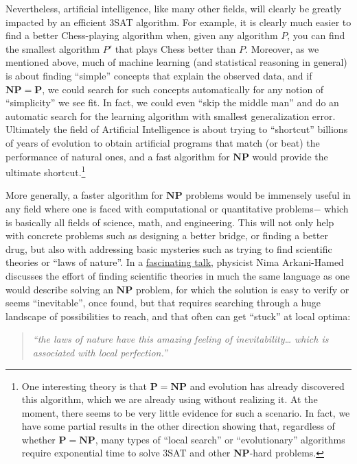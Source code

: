 Nevertheless, artificial intelligence, like many other fields, will
clearly be greatly impacted by an efficient 3SAT algorithm. For example,
it is clearly much easier to find a better Chess-playing algorithm when,
given any algorithm \(P\), you can find the smallest algorithm \(P'\)
that plays Chess better than \(P\). Moreover, as we mentioned above,
much of machine learning (and statistical reasoning in general) is about
finding ``simple'' concepts that explain the observed data, and if
\(\mathbf{NP}=\mathbf{P}\), we could search for such concepts
automatically for any notion of ``simplicity'' we see fit. In fact, we
could even ``skip the middle man'' and do an automatic search for the
learning algorithm with smallest generalization error. Ultimately the
field of Artificial Intelligence is about trying to ``shortcut''
billions of years of evolution to obtain artificial programs that match
(or beat) the performance of natural ones, and a fast algorithm for
\(\mathbf{NP}\) would provide the ultimate shortcut.\footnote{One
  interesting theory is that \(\mathbf{P}=\mathbf{NP}\) and evolution
  has already discovered this algorithm, which we are already using
  without realizing it. At the moment, there seems to be very little
  evidence for such a scenario. In fact, we have some partial results in
  the other direction showing that, regardless of whether
  \(\mathbf{P}=\mathbf{NP}\), many types of ``local search'' or
  ``evolutionary'' algorithms require exponential time to solve 3SAT and
  other \(\mathbf{NP}\)-hard problems.}

More generally, a faster algorithm for \(\mathbf{NP}\) problems would be
immensely useful in any field where one is faced with computational or
quantitative problems\(-\) which is basically all fields of science,
math, and engineering. This will not only help with concrete problems
such as designing a better bridge, or finding a better drug, but also
with addressing basic mysteries such as trying to find scientific
theories or ``laws of nature''. In a
\href{http://www.cornell.edu/video/nima-arkani-hamed-morality-fundamental-physics}{fascinating
talk}, physicist Nima Arkani-Hamed discusses the effort of finding
scientific theories in much the same language as one would describe
solving an \(\mathbf{NP}\) problem, for which the solution is easy to
verify or seems ``inevitable'', once found, but that requires searching
through a huge landscape of possibilities to reach, and that often can
get ``stuck'' at local optima:

\begin{quote}
\emph{``the laws of nature have this amazing feeling of
inevitability\ldots{} which is associated with local perfection.''}
\end{quote}

